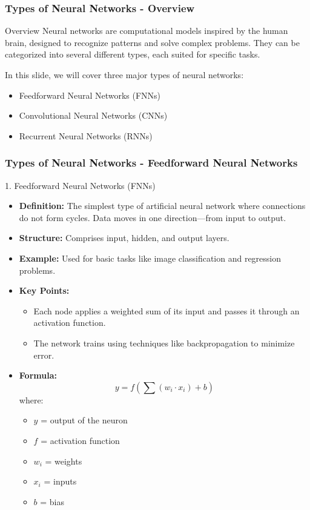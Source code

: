 \documentclass[aspectratio=169]{beamer}
\begin{document}
\begin{frame}[fragile]
    \frametitle{Types of Neural Networks - Overview}
    \begin{block}{Overview}
        Neural networks are computational models inspired by the human brain, designed to recognize patterns and solve complex problems. They can be categorized into several different types, each suited for specific tasks. 
    \end{block}
    In this slide, we will cover three major types of neural networks:
    \begin{itemize}
        \item Feedforward Neural Networks (FNNs)
        \item Convolutional Neural Networks (CNNs)
        \item Recurrent Neural Networks (RNNs)
    \end{itemize}
\end{frame}

\begin{frame}[fragile]
    \frametitle{Types of Neural Networks - Feedforward Neural Networks}
    \begin{block}{1. Feedforward Neural Networks (FNNs)}
        \begin{itemize}
            \item \textbf{Definition:} The simplest type of artificial neural network where connections do not form cycles. Data moves in one direction—from input to output.
            \item \textbf{Structure:} Comprises input, hidden, and output layers.
            \item \textbf{Example:} Used for basic tasks like image classification and regression problems.
            \item \textbf{Key Points:}
            \begin{itemize}
                \item Each node applies a weighted sum of its input and passes it through an activation function.
                \item The network trains using techniques like backpropagation to minimize error.
            \end{itemize}
            \item \textbf{Formula:}
            \begin{equation}
                y = f \left( \sum (w_i \cdot x_i) + b \right)
            \end{equation}
            where:
            \begin{itemize}
                \item $y$ = output of the neuron
                \item $f$ = activation function
                \item $w_i$ = weights
                \item $x_i$ = inputs
                \item $b$ = bias
            \end{itemize}
        \end{itemize}
    \end{block}
\end{frame}
\end{document}
